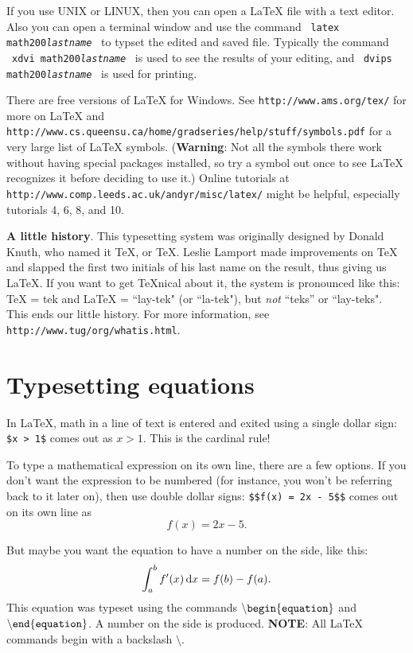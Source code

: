 \documentclass[12pt,letterpaper]{amsart}
\newcommand{\latex}{\LaTeX}
\newcommand{\tex}{\TeX}
\newcommand{\dd}{{\rm d}}
\newcommand{\sm}{\setminus}
\newcommand{\bgn}[1]{$\tt {\sm}begin\{#1\}$}
\newcommand{\nd}[1]{$\tt {\sm}end\{#1\}$}
\theoremstyle{plain}
\theoremstyle{definition}
\numberwithin{equation}{section}
\begin{document}
If you use UNIX or LINUX, then  you can open a \latex{} file with a text 
editor. Also you 
can open a terminal window and use the command \ {\tt latex 
math200{\it lastname}} \ to typset the edited and saved file. Typically the 
command \ {\tt xdvi math200{\it lastname}} \ is used to see the results 
of your editing, and \ {\tt dvips math200{\it lastname}} \ is used for 
printing. 

There are free versions of \latex{} for Windows. See 
{\tt http://www.ams.org/tex/}  
for more on \latex{} and 
{\tt http://www.cs.queensu.ca/home/gradseries/help/stuff/symbols.pdf} 
for a very large list of \latex{} symbols. 
({\bf Warning}: Not all the symbols there work without having special 
packages installed, so try a symbol out once to see \latex{} 
recognizes it before deciding to use it.) 
Online tutorials at 
{\tt http://www.comp.leeds.ac.uk/andyr/misc/latex/} 
might be helpful, especially 
tutorials 4, 6, 8, and 10. 

{\bf A little history}. This typesetting system was originally designed by Donald Knuth, 
who named it
TeX, or \tex.  Leslie Lamport made improvements on \tex{} 
and slapped the first two initials of his last name on the result, thus giving us 
\latex.  If you want to get \tex{nical} about it, the system is pronounced 
like this: 
\tex{} = tek and \latex{} = ``lay-tek" (or ``la-tek"), but {\it not} 
``teks'' or ``lay-teks". 
This ends our little history.  For more information, see {\tt http://www.tug/org/whatis.html}.



\section{Typesetting equations}\label{tsetsec}


In \latex, math in a line of text is entered and exited using 
a single dollar sign: {\tt \$x > 1\$} comes out as $x > 1$. 
This is the cardinal rule!  

To type a mathematical expression on its own line, 
there are a few options.
If you don't want the expression to be numbered 
(for instance, you won't be referring back to it later on), then use
double dollar signs: {\tt \$\$f(x) = 2x - 5\$\$} comes out 
on its own line as 
$$
f(x) = 2x - 5.
$$


But maybe you want the equation to have a number on the side, like this:
\begin{equation}\label{eqn-one}
\int_a^b f'(x)\,\dd{x} = f(b) - f(a).
\end{equation}
This equation was typeset 
using the commands 
\bgn{equation}
and \nd{equation}.
A number on the side is produced. 
{\bf NOTE}:  
All \latex{} commands begin with a backslash $\sm$.
\end{document}
